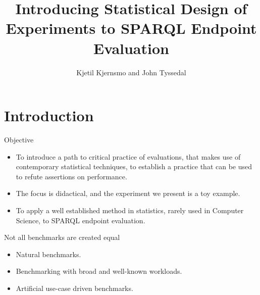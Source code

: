 \documentclass[english,handout,aspectratio=169]{ifislide}
\begin{document}


\title[DoE in SPARQL Evaluations]{Introducing Statistical Design of Experiments to SPARQL Endpoint Evaluation}
\subtitle{}
\author{Kjetil Kjernsmo and John Tyssedal}
\maketitle

\section{Introduction} 

\begin{frame}{Objective}
  \begin{itemize}
  \item To introduce a path to critical practice of evaluations, that makes
use of contemporary statistical techniques, to establish a practice
that can be used to refute assertions on performance.
\item The focus is didactical, and the experiment we present is a toy
example.
\item To apply a well established method in statistics, rarely used in
  Computer Science, to SPARQL endpoint evaluation.

  \end{itemize}

\end{frame}

\begin{frame}{Not all benchmarks are created equal}

  \begin{itemize}
  \item Natural benchmarks.
  \item Benchmarking with broad and well-known workloads. 
  \item Artificial use-case driven benchmarks.
  \end{itemize}

\end{frame}
\end{document}
